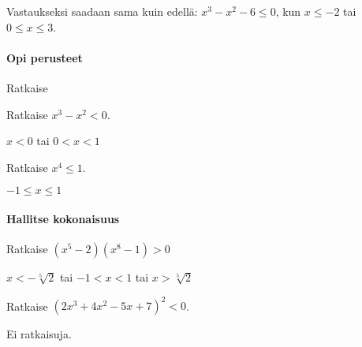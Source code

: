 Vastaukseksi saadaan sama kuin edellä: $x^3-x^2-6 \leq 0$, kun $x\leq -2$ tai $0\leq x \leq 3$.

\begin{tehtavasivu}

\paragraph*{Opi perusteet}

\begin{tehtava}
    Ratkaise
    \begin{alakohdat}
    \end{alakohdat}
    \begin{vastaus}
        \begin{alakohdat}
        \end{alakohdat}
    \end{vastaus}
\end{tehtava}

\begin{tehtava}
    Ratkaise $x^3-x^2<0$.
    \begin{vastaus}
        $x<0$ tai $0<x<1$
    \end{vastaus}
\end{tehtava}

\begin{tehtava}
    Ratkaise $x^4 \le 1$.
    \begin{vastaus}
        $-1 \le x \le 1$
    \end{vastaus}
\end{tehtava}

\paragraph*{Hallitse kokonaisuus}

\begin{tehtava}
Ratkaise $(x^5-2)(x^8-1) >0$
\begin{vastaus}
$x< -\sqrt[5]{2}$ tai $-1<x<1$ tai $x >\sqrt[5]{2}$
\end{vastaus}
\end{tehtava}

\begin{tehtava}
    Ratkaise $(2x^3+4x^2-5x+7)^2 < 0$.
    \begin{vastaus}
        Ei ratkaisuja.
    \end{vastaus}
\end{tehtava}


\end{tehtavasivu}
